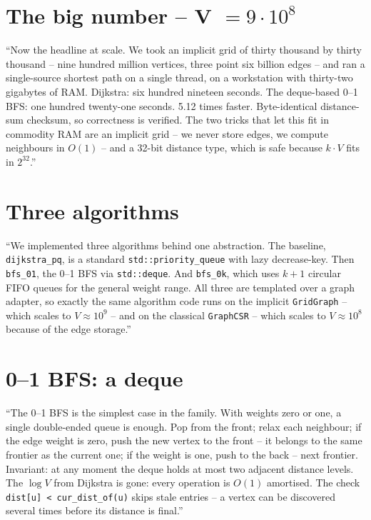 \documentclass[11pt,a4paper]{article}
\begin{document}
\section{The big number -- V $= 9\cdot 10^8$}
``Now the headline at scale. We took an implicit grid of thirty
thousand by thirty thousand -- nine hundred million vertices, three
point six billion edges -- and ran a single-source shortest path on a
single thread, on a workstation with thirty-two gigabytes of RAM.
Dijkstra: six hundred nineteen seconds. The deque-based 0--1 BFS: one
hundred twenty-one seconds. 5.12 times faster. Byte-identical
distance-sum checksum, so correctness is verified. The two tricks that
let this fit in commodity RAM are an implicit grid -- we never store
edges, we compute neighbours in $O(1)$ -- and a 32-bit distance type,
which is safe because $k\cdot V$ fits in $2^{32}$.''
\hrulefill

\section{Three algorithms}
``We implemented three algorithms behind one abstraction. The baseline,
\texttt{dijkstra\_pq}, is a standard \texttt{std::priority\_queue} with
lazy decrease-key. Then \texttt{bfs\_01}, the 0--1 BFS via
\texttt{std::deque}. And \texttt{bfs\_0k}, which uses $k{+}1$ circular
FIFO queues for the general weight range. All three are templated over
a graph adapter, so exactly the same algorithm code runs on the
implicit \texttt{GridGraph} -- which scales to $V \approx 10^9$ -- and
on the classical \texttt{GraphCSR} -- which scales to $V \approx 10^8$
because of the edge storage.''
\hrulefill

\section{0--1 BFS: a deque}
``The 0--1 BFS is the simplest case in the family. With weights zero
or one, a single double-ended queue is enough. Pop from the front;
relax each neighbour; if the edge weight is zero, push the new vertex
to the front -- it belongs to the same frontier as the current one;
if the weight is one, push to the back -- next frontier. Invariant: at
any moment the deque holds at most two adjacent distance levels. The
$\log V$ from Dijkstra is gone: every operation is $O(1)$ amortised.
The check \texttt{dist[u] < cur\_dist\_of(u)} skips stale entries -- a
vertex can be discovered several times before its distance is final.''
\hrulefill
\end{document}
